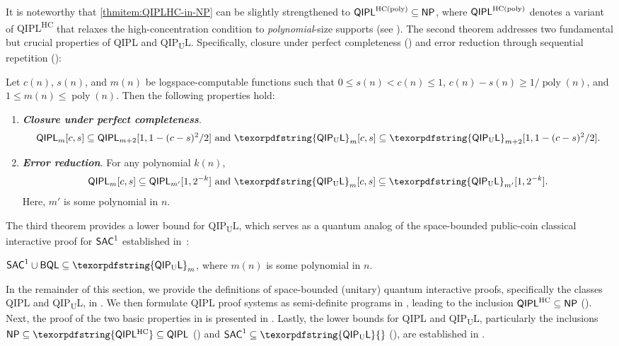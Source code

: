 \documentclass[11pt, a4paper]{article}
\numberwithin{equation}{section}
\numberwithin{figure}{section}
\newcommand{\NP}{\textnormal{\textsf{NP}}\xspace}
\newcommand{\QIPL}{\textnormal{\textsf{QIPL}}\xspace}
\newcommand{\QIPUL}{\texorpdfstring{\textnormal{\textsf{QIP}\textsubscript{\textnormal{U}}\textsf{L}}}\xspace}
\newcommand{\QIPLHC}{\texorpdfstring{\textnormal{\textsf{QIPL}\textsuperscript{\textnormal{HC}}}}\xspace}
\newcommand{\HC}{\mathrm{HC}}
\newcommand{\BQL}{\textnormal{\textsf{BQL}}\xspace}
\newcommand{\SAC}{\textnormal{\textsf{SAC}}\xspace}
\DeclareMathOperator\poly{poly}
\begin{document}
It is noteworthy that \ref{thmitem:QIPLHC-in-NP} can be slightly strengthened to $\QIPL^{\HC(\poly)} \subseteq \NP$, where $\QIPL^{\HC(\poly)}$ denotes a variant of \QIPLHC{} that relaxes the high-concentration condition to \textit{polynomial}-size supports (see ).
The second theorem addresses two fundamental but crucial properties of \QIPL{} and \QIPUL{}. Specifically, closure under perfect completeness () and error reduction through sequential repetition (): 

\begin{theorem}[Basic properties for \QIPL{} and \QIPUL{}]
    \label{thm:QIPL-basic-properties}
    Let $c(n)$, $s(n)$, and $m(n)$ be logspace-computable functions such that $0 \leq s(n) < c(n) \leq 1$, $c(n) - s(n) \geq 1/\poly(n)$, and $1 \leq m(n) \leq \poly(n)$. Then the following properties hold:
    \begin{enumerate}[label={\upshape(\arabic*)}, topsep=0.33em, itemsep=0.33em, parsep=0.33em]
        \item \textbf{\emph{Closure under perfect completeness}}.         \label{thmitem:QIPL-perfect-completeness}
        \[ \QIPL_m[c,s] \subseteq \QIPL_{m+2}[1,1-(c-s)^2/2] \text{ and } \QIPUL_m[c,s] \subseteq \QIPUL_{m+2}[1,1-(c-s)^2/2]. \]
        \item \textbf{\emph{Error reduction}}. For any polynomial $k(n)$, 
        \[ \QIPL_m[c,s] \subseteq \QIPL_{m'}[1,2^{-k}] \text{ and } \QIPUL_m[c,s] \subseteq \QIPUL_{m'}[1,2^{-k}]. \]
        Here, $m'$ is some polynomial in $n$. \label{thmitem:QIPL-error-reduction}
    \end{enumerate}
\end{theorem}

The third theorem provides a lower bound for \QIPUL{}, which serves as a quantum analog of the space-bounded public-coin classical interactive proof for $\SAC^1$ established in~\cite{Fortnow89}: 
\begin{theorem}
    \label{thm:LOGCFL-in-QIPUL}
    $\SAC^1 \cup \BQL \subseteq \QIPUL_m$, where $m(n)$ is some polynomial in $n$.
\end{theorem}

\vspace{1em}
In the remainder of this section, we provide the definitions of space-bounded (unitary) quantum interactive proofs, specifically the classes \QIPL{} and \QIPUL{}, in . 
We then formulate \QIPL{} proof systems as semi-definite programs in , leading to the inclusion $\QIPL^\HC \subseteq \NP$ (). 
Next, the proof of the two basic properties in  is presented in . 
Lastly, the lower bounds for \QIPL{} and \QIPUL{}, particularly the inclusions $\NP \subseteq \QIPLHC \subseteq \QIPL$ () and $\SAC^1 \subseteq \QIPUL{}$ (), are established in . 
\end{document}
